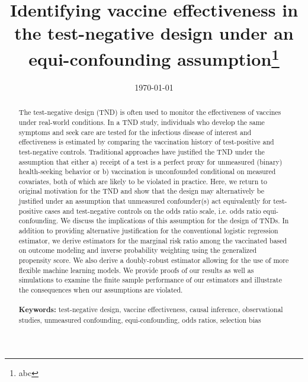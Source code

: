\documentclass[11pt]{article}
\begin{document}
\begin{titlepage}
\title{Identifying vaccine effectiveness in the test-negative design under an equi-confounding assumption\thanks{abc}}
\author[1]{ }
\date{\today}
\maketitle

\begin{abstract}
    The test-negative design (TND) is often used to monitor the effectiveness of vaccines under real-world conditions. In a TND study, individuals who develop the same symptoms and seek care are tested for the infectious disease of interest and effectiveness is estimated by comparing the vaccination history of test-positive and test-negative controls. Traditional approaches have justified the TND under the assumption that either a) receipt of a test is a perfect proxy for unmeasured (binary) health-seeking behavior or b) vaccination is unconfounded conditional on measured covariates, both of which are likely to be violated in practice. Here, we return to original motivation for the TND and show that the design may alternatively be justified under an assumption that unmeasured confounder(s) act equivalently for test-positive cases and test-negative controls on the odds ratio scale, i.e. odds ratio equi-confounding. We discuss the implications of this assumption for the design of TNDs. In addition to providing alternative justification for the conventional logistic regression estimator, we derive estimators for the marginal risk ratio among the vaccinated based on outcome modeling and inverse probability weighting using the generalized propensity score. We also derive a doubly-robust estimator allowing for the use of more flexible machine learning models. We provide proofs of our results as well as simulations to examine the finite sample performance of our estimators and illustrate the consequences when our assumptions are violated.
\noindent \\
\vspace{0in} \\
\noindent\textbf{Keywords:} test-negative design, vaccine effectiveness, causal inference, observational studies, unmeasured confounding, equi-confounding, odds ratios, selection bias
\bigskip
\end{abstract}
\setcounter{page}{0}
\thispagestyle{empty}
\end{titlepage}
\pagebreak \newpage
\end{document}
